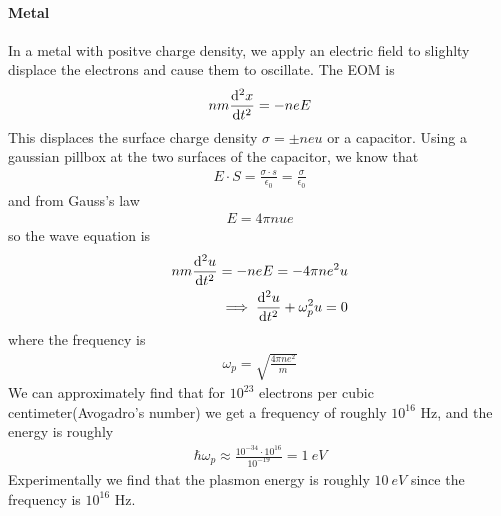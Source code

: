 \documentclass[../main.tex]{subfiles}
\begin{document}
\paragraph*{Metal} In a metal with positve charge density, we apply an electric field to slighlty
displace the electrons and cause them to oscillate. The EOM is
\begin{align*}
    n m \dv[2]{x}{t} = -neE
\end{align*}
This displaces the surface charge density $\sigma = \pm neu$ or a capacitor. Using a gaussian pillbox at the 
two surfaces of the capacitor, we know that
\begin{align*}
    E \cdot S = \frac{\sigma \cdot s}{\epsilon_0} = \frac{\sigma}{\epsilon_0}
\end{align*}
and from Gauss's law
\begin{align*}
    E = 4\pi n u e
\end{align*}
so the wave equation is
\begin{align*}
    nm\dv[2]{u}{t} = -neE = -4\pi ne^2 u \\
    \implies \dv[2]{u}{t} + \omega_p^2 u = 0
\end{align*}
where the frequency is
\begin{align*}
    \omega_p = \sqrt{\frac{4\pi ne^2}{m}}
\end{align*}
We can approximately find that for $10^{23}$ electrons per cubic centimeter(Avogadro's number) we 
get a frequency of roughly $10^{16}$ Hz, and the energy is roughly
\begin{align*}
    \hbar \omega_p \approx \frac{10^{-34} \cdot 10^{16}}{10^{-19}} = \qty{1}{eV}
\end{align*}
Experimentally we find that the plasmon energy is roughly $\qty{10}{eV}$ since the frequency is
$10^{16}$ Hz. 
\end{document}
